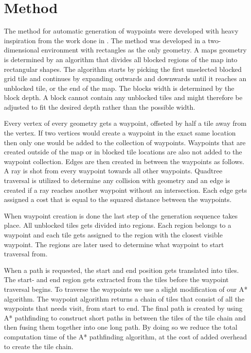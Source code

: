 \documentclass[a4paper]{article}
\begin{document}
{\section{Method}
The method for automatic generation of waypoints were developed with heavy inspiration from the work done in \cite{dynaPF15}. The method was developed in a two-dimensional environment with rectangles as the only geometry. A maps geometry is determined by an algorithm that divides all blocked regions of the map into rectangular shapes. The algorithm starts by picking the first unselected blocked grid tile and continues by expanding outwards and downwards until it reaches an unblocked tile, or the end of the map. The blocks width is determined by the block depth. A block cannot contain any unblocked tiles and might therefore be adjusted to fit the desired depth rather than the possible width.

Every vertex of every geometry gets a waypoint, offseted by half a tile away from the vertex. If two vertices would create a waypoint in the exact same location then only one would be added to the collection of waypoints. Waypoints that are created outside of the map or in blocked tile locations are also not added to the waypoint collection. Edges are then created in between the waypoints as follows. A ray is shot from every waypoint towards all other waypoints. Quadtree traversal is utilized to determine any collision with geometry and an edge is created if a ray reaches another waypoint without an intersection. Each edge gets assigned a cost that is equal to the squared distance between the waypoints.
	
When waypoint creation is done the last step of the generation sequence takes place. All unblocked tiles gets divided into regions. Each region belongs to a waypoint and each tile gets assigned to the region with the closest visible waypoint. The regions are later used to determine what waypoint to start traversal from.
	
When a path is requested, the start and end position gets translated into tiles. The start- and end region gets extracted from the tiles before the waypoint traversal begins. To traverse the waypoints we use a slight modification of our A* algorithm. The waypoint algorithm returns a chain of tiles that consist of all the waypoints that needs visit, from start to end. The final path is created by using A* pathfinding to construct short paths in between the tiles of the tile chain and then fusing them together into one long path. By doing so we reduce the total computation time of the A* pathfinding algorithm, at the cost of added overhead to create the tile chain.
	
}
\end{document}

